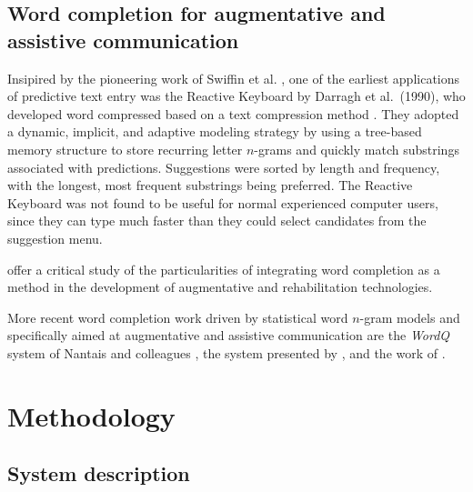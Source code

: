 \documentclass[12pt]{article}
\begin{document}

\subsection{Word completion for augmentative and assistive communication}

Insipired by the pioneering work of Swiffin et al. \citeyear{Swiffin+85}, one of the earliest applications of predictive text entry was the Reactive Keyboard by Darragh et al.~(1990), who developed word compressed based on a text compression method \cite{Darragh+90}. They adopted a dynamic, implicit, and adaptive modeling strategy by using a tree-based memory structure to store recurring letter $n$-grams and quickly match substrings associated with predictions. Suggestions were sorted by length and frequency, with the longest, most frequent substrings being preferred. The Reactive Keyboard was not found to be useful for normal experienced computer users, since they can type much faster than they could select candidates from the suggestion menu. 

 offer a critical study of the particularities of integrating word completion as a method in the development of augmentative and rehabilitation technologies.

More recent word completion work driven by statistical word $n$-gram models and specifically aimed at augmentative and assistive communication are the {\it WordQ}\/ system of Nantais and colleagues \cite{Nantais+01,Shein+01}, the system presented by , and the work of .

\section{Methodology}

\subsection{System description} \label{algorithm}
\end{document}
